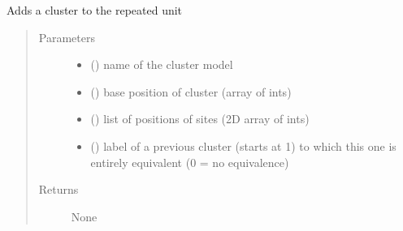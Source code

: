 \documentclass[letterpaper,10pt,english]{sphinxmanual}
\begin{document}
\begin{fulllineitems}
\label{\detokenize{functions:pyqcm.add_cluster}}
\sphinxAtStartPar
Adds a cluster to the repeated unit
\begin{quote}\begin{description}
\item[{Parameters}] \leavevmode\begin{itemize}
\item {} 
\sphinxAtStartPar
{} () \textendash{} name of the cluster model

\item {} 
\sphinxAtStartPar
{} (\sphinxstyleliteralemphasis{\sphinxupquote{{[}}}\sphinxstyleliteralemphasis{\sphinxupquote{{]}}}) \textendash{} base position of cluster (array of ints)

\item {} 
\sphinxAtStartPar
{} (\sphinxstyleliteralemphasis{\sphinxupquote{{[}}}\sphinxstyleliteralemphasis{\sphinxupquote{{[}}}\sphinxstyleliteralemphasis{\sphinxupquote{{]}}}\sphinxstyleliteralemphasis{\sphinxupquote{{]}}}) \textendash{} list of positions of sites (2D array of ints)

\item {} 
\sphinxAtStartPar
{} (\sphinxstyleliteralemphasis{\sphinxupquote{{[}}}\sphinxstyleliteralemphasis{\sphinxupquote{{]}}}) \textendash{} label of a previous cluster (starts at 1) to which this one is entirely equivalent (0 = no equivalence)

\end{itemize}

\item[{Returns}] \leavevmode
\sphinxAtStartPar
None

\end{description}\end{quote}

\end{fulllineitems}
\end{document}
